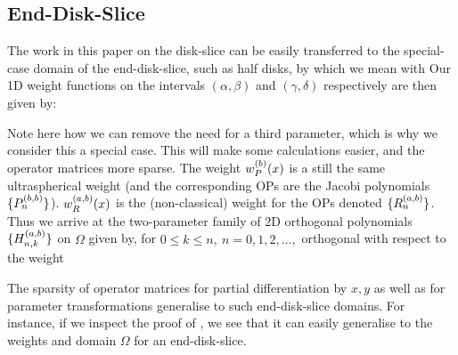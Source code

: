 \subsection{End-Disk-Slice}\label{section:ds:enddiskslice}

The work in this paper on the disk-slice can be easily transferred to the special-case domain of the end-disk-slice, such as half disks, by which we mean
with
Our 1D weight functions on the intervals $(\alpha, \beta)$ and $(\gamma, \delta)$ respectively are then given by:

Note here how we can remove the need for a third parameter, which is why we consider this a special case. This will make some calculations easier, and the operator matrices more sparse. The weight $w_P^{(b)}(x)$ is a still the same ultraspherical weight (and the corresponding OPs are the Jacobi polynomials $\{{P}_n^{(b, b)}\}$). $w_R^{(a,b)}(x)$ is the (non-classical) weight for the OPs denoted $\{R_n^{(a,b)}\}$. Thus we arrive at the two-parameter family of 2D orthogonal polynomials $\{H_{n,k}^{(a,b)}\}$ on $\Omega$ given by, for \(0 \le k \le n, \: n = 0,1,2,\dots,\)
orthogonal with respect to the weight

The sparsity of operator matrices for partial differentiation by $x, y$ as well as for parameter transformations generalise to such end-disk-slice domains. For instance, if we inspect the proof of , we see that it can easily generalise to the weights and domain $\Omega$ for an end-disk-slice.

